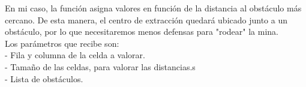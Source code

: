 En mi caso, la función asigna valores en función de la distancia al obstáculo más cercano. De esta manera, el centro de extracción quedará ubicado junto a un obstáculo, por lo que necesitaremos menos defensas para "rodear" la mina. \\

Los parámetros que recibe son: \\
	- Fila y columna de la celda a valorar.\\
	- Tamaño de las celdas, para valorar las distancias.s\\
	- Lista de obstáculos.\\

